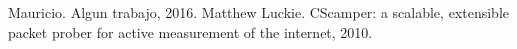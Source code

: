 
\begin{thebibliography}{0}
   Mauricio. Algun trabajo, 2016.
   Matthew Luckie. CScamper: a scalable, extensible packet 
                              prober for active measurement of the internet, 2010.
\end{thebibliography}